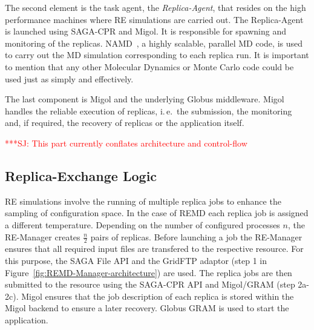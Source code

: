 \documentclass{rspublic}
\newcommand{\alnote}[1]{ {\textcolor{blue} { ***AL: #1 }}}
\newcommand{\jhanote}[1]{ {\textcolor{red} { ***SJ: #1 }}}
\newcommand{\alnote}[1]{}
\newcommand{\jhanote}[1]{}
\newcommand{\replicaagent}[1]{Replica-Agent }
\newcommand{\remanager}[1]{RE-Manager }
\begin{document}
The second element is the task agent, the \textit{Replica-Agent},
that resides on the high performance machines where RE simulations
are carried out. The \replicaagent\ is launched using SAGA-CPR and Migol.
It is responsible for spawning and monitoring of the replicas. 
NAMD~\citep{Phillips:2005gd}, a highly scalable, parallel MD
code, is used to carry out the MD simulation corresponding to each
replica run. It is important to mention that any other Molecular Dynamics 
or Monte Carlo code could be used just as simply and effectively.

The last component is Migol and the underlying Globus middleware. 
Migol handles the reliable execution of replicas, i.\,e.\ the submission,
the monitoring and, if required, the recovery of replicas or the application itself. 



                                  

\jhanote{This part currently conflates architecture and control-flow}
                       
\subsection{Replica-Exchange Logic}
                                            
RE simulations involve the running of multiple replica jobs to enhance
the sampling of configuration space. In the case of REMD each replica
job is assigned a different temperature.  Depending on the number of
configured processes $n$, the \remanager\ creates $\frac{n}{2}$ pairs
of replicas.  Before launching a job the \remanager\ ensures that all
required input files are transfered to the respective resource. For
this purpose, the SAGA File API and the GridFTP adaptor (step 1 in
Figure~\ref{fig:REMD-Manager-architecture}) are used.  The replica
jobs are then submitted to the resource using the SAGA-CPR API and
Migol/GRAM (step 2a-2c). Migol ensures that the job description of
each replica is stored within the Migol backend to ensure a later
recovery. Globus GRAM is used to start the application.
\end{document}
